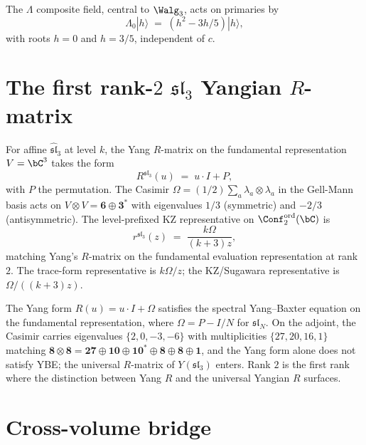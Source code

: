 The $\Lambda$ composite field, central to $\Walg_3$, acts on
primaries by
\[
\Lambda_0|h\rangle
\;=\;
(h^2 - 3h/5)|h\rangle,
\]
with roots $h = 0$ and $h = 3/5$, independent of $c$.

\section{The first rank-$2$ $\mathfrak{sl}_3$ Yangian $R$-matrix}
\label{sec:dnp-master-sl3-yangian}

\begin{computation}
\label{comp:dnp-master-sl3-yangian}
For affine $\widehat{\mathfrak{sl}}_3$ at level $k$, the Yang
$R$-matrix on the fundamental representation $V = \bC^3$ takes the form
\[
R^{\mathfrak{sl}_3}(u)
\;=\;
u\cdot I + P,
\]
with $P$ the permutation. The Casimir
$\Omega = (1/2)\sum_a \lambda_a\otimes\lambda_a$ in the Gell-Mann
basis acts on $V\otimes V = \mathbf{6}\oplus\mathbf{3}^*$ with
eigenvalues $1/3$ (symmetric) and $-2/3$ (antisymmetric). The
level-prefixed KZ representative on
$\Conf_2^{\mathrm{ord}}(\bC)$ is
\[
r^{\mathfrak{sl}_3}(z)
\;=\;
\frac{k\Omega}{(k+3) z},
\]
matching Yang's $R$-matrix on the fundamental evaluation
representation at rank $2$. The trace-form representative is
$k\Omega/z$; the KZ/Sugawara representative is $\Omega/((k+3)z)$.
\end{computation}

\begin{remark}
\label{rem:dnp-master-fund-adj}
The Yang form $R(u) = u\cdot I + \Omega$ satisfies the spectral
Yang--Baxter equation on the fundamental representation, where
$\Omega = P - I/N$ for $\mathfrak{sl}_N$. On the adjoint, the
Casimir carries eigenvalues $\{2,0,-3,-6\}$ with multiplicities
$\{27,20,16,1\}$ matching
$\mathbf{8}\otimes\mathbf{8} = \mathbf{27}\oplus\mathbf{10}\oplus
\mathbf{10}^*\oplus\mathbf{8}\oplus\mathbf{8}\oplus\mathbf{1}$,
and the Yang form alone does not satisfy YBE; the universal
$R$-matrix of $Y(\mathfrak{sl}_3)$ enters. Rank $2$ is the first
rank where the distinction between Yang $R$ and the universal
Yangian $R$ surfaces.
\end{remark}

\section{Cross-volume bridge}
\label{sec:dnp-master-cross-volume}

